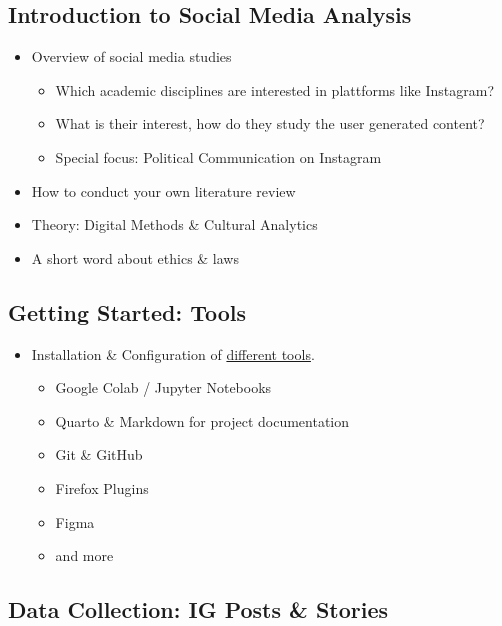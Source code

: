 \documentclass[
  letterpaper,
  DIV=11,
  numbers=noendperiod]{scrartcl}
\providecommand{\tightlist}{%
  \setlength{\itemsep}{0pt}\setlength{\parskip}{0pt}}\usepackage{longtable,booktabs,array}
\begin{document}
\hypertarget{introduction-to-social-media-analysis}{%
\subsection{Introduction to Social Media
Analysis}\label{introduction-to-social-media-analysis}}

\begin{itemize}
\tightlist
\item
  Overview of social media studies

  \begin{itemize}
  \tightlist
  \item
    Which academic disciplines are interested in plattforms like
    Instagram?
  \item
    What is their interest, how do they study the user generated
    content?
  \item
    Special focus: Political Communication on Instagram
  \end{itemize}
\item
  How to conduct your own literature review
\item
  Theory: Digital Methods \& Cultural Analytics
\item
  A short word about ethics \& laws
\end{itemize}

\hypertarget{getting-started-tools}{%
\subsection{Getting Started: Tools}\label{getting-started-tools}}

\begin{itemize}
\tightlist
\item
  Installation \& Configuration of \href{tools.qmd}{different tools}.

  \begin{itemize}
  \tightlist
  \item
    Google Colab / Jupyter Notebooks
  \item
    Quarto \& Markdown for project documentation
  \item
    Git \& GitHub
  \item
    Firefox Plugins
  \item
    Figma
  \item
    and more
  \end{itemize}
\end{itemize}

\hypertarget{data-collection-ig-posts-stories}{%
\subsection{Data Collection: IG Posts \&
Stories}\label{data-collection-ig-posts-stories}}
\end{document}
